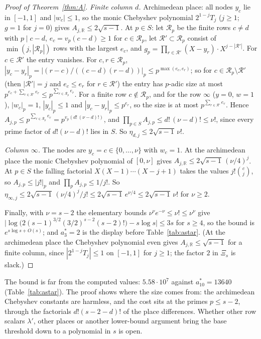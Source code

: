 \documentclass[11pt]{amsart}
\theoremstyle{definition}
\theoremstyle{plain}
\providecommand{\R}{\mathbb{R}}
\begin{document}
\begin{proof}[Proof of Theorem~\ref{thm:A}]
\emph{Finite column $d$.} Archimedean place: all nodes $y_c$ lie in $[-1,1]$ and $|w_c|\le1$, so the monic Chebyshev polynomial $2^{1-j}T_j$ ($j\ge1$; $g=1$ for $j=0$) gives $A_{j,\R}\le2\sqrt{s-1}$. At $p\in S$: let $\mathcal R_p$ be the finite rows $c\ne d$ with $p\mid c-d$, $e_c=v_p(c-d)\ge1$ for $c\in \mathcal R_p$, let $\mathcal R'\subset \mathcal R_p$ consist of $\min(j,|\mathcal R_p|)$ rows with the largest $e_c$, and $g_p=\prod_{r\in \mathcal R'}(X-y_r)\cdot X^{j-|\mathcal R'|}$. For $c\in \mathcal R'$ the entry vanishes. For $c,r\in \mathcal R_p$, $|y_c-y_r|_p=|(r-c)/((c-d)(r-d))|_p\le p^{\max(e_c,e_r)}$; so for $c\in \mathcal R_p\setminus \mathcal R'$ (then $|\mathcal R'|=j$ and $e_c\le e_r$ for $r\in \mathcal R'$) the entry has $p$-adic size at most $p^{e_c+\sum_{r\in \mathcal R'}e_r}\le p^{\sum_{r\in \mathcal R_p}e_r}$. For a finite row $c\notin \mathcal R_p$, and for the row $\infty$ ($y=0$, $w=1$), $|w_c|_p=1$, $|y_c|_p\le1$ and $|y_c-y_r|_p\le p^{e_r}$, so the size is at most $p^{\sum_{r\in \mathcal R'}e_r}$. Hence $A_{j,p}\le p^{\sum_{r\in \mathcal R_p}e_r}=p^{v_p(d!\,(\nu-d)!)}$, and $\prod_{p\in S}A_{j,p}\le d!\,(\nu-d)!\le \nu!$, since every prime factor of $d!(\nu-d)!$ lies in $S$. So $\eta_{d,j}\le2\sqrt{s-1}\,\nu!$.

\emph{Column $\infty$.} The nodes are $y_c=c\in\{0,\dots,\nu\}$ with $w_c=1$. At the archimedean place the monic Chebyshev polynomial of $[0,\nu]$ gives $A_{j,\R}\le2\sqrt{s-1}\,(\nu/4)^j$. At $p\in S$ the falling factorial $X(X-1)\cdots(X-j+1)$ takes the values $j!\binom cj$, so $A_{j,p}\le|j!|_p$ and $\prod_pA_{j,p}\le1/j!$. So $\eta_{\infty,j}\le2\sqrt{s-1}\,(\nu/4)^j/j!\le2\sqrt{s-1}\,e^{\nu/4}\le2\sqrt{s-1}\,\nu!$ for $\nu\ge2$.

Finally, with $\nu=s-2$ the elementary bounds $\nu^\nu e^{-\nu}\le \nu!\le \nu^\nu$ give $\bigl|\log\bigl(2(s-1)^{3/2}(3/2)^{s-2}(s-2)!\bigr)-s\log s\bigr|\le3s$ for $s\ge4$, so the bound is $e^{s\log s+O(s)}$; and $a^*_3=2$ is the display before Table~\ref{tab:astar}. (At the archimedean place the Chebyshev polynomial even gives $A_{j,\R}\le\sqrt{s-1}$ for a finite column, since $|2^{1-j}T_j|\le1$ on $[-1,1]$ for $j\ge1$; the factor $2$ in $\Xi_s$ is slack.)
\end{proof}

The bound is far from the computed values: $5.58\cdot10^7$ against $a^*_{10}=13640$ (Table~\ref{tab:astar}). The proof shows where the size comes from: the archimedean Chebyshev constants are harmless, and the cost sits at the primes $p\le s-2$, through the factorials $d!(s-2-d)!$ of the place differences. Whether other row scalars $\lambda'$, other places or another lower-bound argument bring the base threshold down to a polynomial in $s$ is open.
\end{document}
